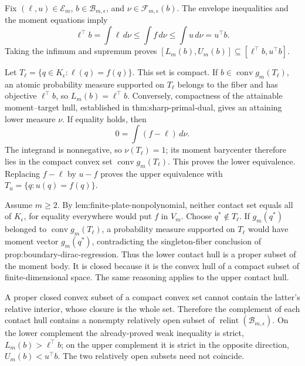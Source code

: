 Fix \((\ell,u)\in\mathcal E_m\), \(b\in\mathcal B_{m,\epsilon}\), and \(\nu\in\mathcal F_{m,\epsilon}(b)\).  The envelope inequalities and the moment equations imply
\[
 \ell^{\top}b=\int\ell\,d\nu
 \leq\int f\,d\nu
 \leq\int u\,d\nu=u^{\top}b.
\]
Taking the infimum and supremum proves \([L_m(b),U_m(b)]\subseteq[\ell^{\top}b,u^{\top}b]\).

Let \(T_{\ell}=\{q\in K_{\epsilon}:\ell(q)=f(q)\}\).  This set is compact.  If \(b\in\operatorname{conv}g_m(T_{\ell})\), an atomic probability measure supported on \(T_{\ell}\) belongs to the fiber and has objective \(\ell^{\top}b\), so \(L_m(b)=\ell^{\top}b\).  Conversely, compactness of the attainable moment--target hull, established in thm:sharp-primal-dual, gives an attaining lower measure \(\nu\).  If equality holds, then
\[
 0=\int(f-\ell)\,d\nu.
\]
The integrand is nonnegative, so \(\nu(T_{\ell})=1\); its moment barycenter therefore lies in the compact convex set \(\operatorname{conv}g_m(T_{\ell})\).  This proves the lower equivalence.  Replacing \(f-\ell\) by \(u-f\) proves the upper equivalence with \(T_u=\{q:u(q)=f(q)\}\).

Assume \(m\geq2\).  By lem:finite-plate-nonpolynomial, neither contact set equals all of \(K_{\epsilon}\), for equality everywhere would put \(f\) in \(V_m\).  Choose \(q^*\notin T_{\ell}\).  If \(g_m(q^*)\) belonged to \(\operatorname{conv}g_m(T_{\ell})\), a probability measure supported on \(T_{\ell}\) would have moment vector \(g_m(q^*)\), contradicting the singleton-fiber conclusion of prop:boundary-dirac-regression.  Thus the lower contact hull is a proper subset of the moment body.  It is closed because it is the convex hull of a compact subset of finite-dimensional space.  The same reasoning applies to the upper contact hull.

A proper closed convex subset of a compact convex set cannot contain the latter's relative interior, whose closure is the whole set.  Therefore the complement of each contact hull contains a nonempty relatively open subset of \(\operatorname{relint}(\mathcal B_{m,\epsilon})\).  On the lower complement the already-proved weak inequality is strict, \(L_m(b)>\ell^{\top}b\); on the upper complement it is strict in the opposite direction, \(U_m(b)<u^{\top}b\).  The two relatively open subsets need not coincide.